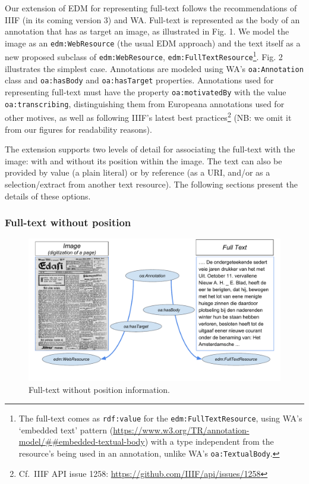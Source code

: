 \documentclass[a4paper,UKenglish,cleveref, autoref]{oasics-v2019}
\begin{document}
Our extension of EDM for representing full-text follows the recommendations of IIIF (in its coming version 3) and WA. Full-text is represented as the body of an annotation that has as target an image, as illustrated in Fig. 1. We model the image as an \verb+edm:WebResource+ (the usual EDM approach) and the text itself as a new proposed subclass of \verb+edm:WebResource+, 
\verb+edm:FullTextResource+\footnote{The full-text comes as \verb+rdf:value+ for the \verb+edm:FullTextResource+, using WA’s `embedded text' pattern (\url{https://www.w3.org/TR/annotation-model/##embedded-textual-body}) with a type independent from the resource’s being used in an annotation, unlike WA’s \verb+oa:TextualBody+.}.
Fig. 2 illustrates the simplest case. Annotations are modeled using WA's \verb+oa:Annotation+ class and \verb+oa:hasBody+ and \verb+oa:hasTarget+ properties. Annotations used for representing full-text must have the property \verb+oa:motivatedBy+ with the value \verb+oa:transcribing+, distinguishing them from Europeana annotations used for other motives, as well as following IIIF's latest best practices\footnote{Cf.\, IIIF API issue 1258: \url{https://github.com/IIIF/api/issues/1258}}
(NB: we omit it from our figures for readability reasons).

The extension supports two levels of detail for associating the full-text with the image: with and without its position within the image. The text can also be provided by value (a plain literal) or by reference (as a URI, and/or as a selection/extract from another text resource). The following sections present the details of these options.

\subsubsection{Full-text without position}

\begin{figure}
    \centering
    \includegraphics{Fig2}
    \caption{Full-text without position information.}
\end{figure}
\end{document}
